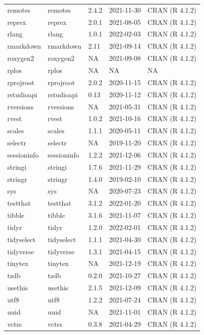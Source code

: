 \begin{tabular}{lllll}
remotes & remotes & 2.4.2 & 2021-11-30 & CRAN (R 4.1.2)\\
reprex & reprex & 2.0.1 & 2021-08-05 & CRAN (R 4.1.2)\\
rlang & rlang & 1.0.1 & 2022-02-03 & CRAN (R 4.1.2)\\
\addlinespace
rmarkdown & rmarkdown & 2.11 & 2021-09-14 & CRAN (R 4.1.2)\\
roxygen2 & roxygen2 & NA & 2021-09-08 & CRAN (R 4.1.2)\\
rplos & rplos & NA & NA & NA\\
rprojroot & rprojroot & 2.0.2 & 2020-11-15 & CRAN (R 4.1.2)\\
rstudioapi & rstudioapi & 0.13 & 2020-11-12 & CRAN (R 4.1.2)\\
\addlinespace
rversions & rversions & NA & 2021-05-31 & CRAN (R 4.1.2)\\
rvest & rvest & 1.0.2 & 2021-10-16 & CRAN (R 4.1.2)\\
scales & scales & 1.1.1 & 2020-05-11 & CRAN (R 4.1.2)\\
selectr & selectr & NA & 2019-11-20 & CRAN (R 4.1.2)\\
sessioninfo & sessioninfo & 1.2.2 & 2021-12-06 & CRAN (R 4.1.2)\\
\addlinespace
stringi & stringi & 1.7.6 & 2021-11-29 & CRAN (R 4.1.2)\\
stringr & stringr & 1.4.0 & 2019-02-10 & CRAN (R 4.1.2)\\
sys & sys & NA & 2020-07-23 & CRAN (R 4.1.2)\\
testthat & testthat & 3.1.2 & 2022-01-20 & CRAN (R 4.1.2)\\
tibble & tibble & 3.1.6 & 2021-11-07 & CRAN (R 4.1.2)\\
\addlinespace
tidyr & tidyr & 1.2.0 & 2022-02-01 & CRAN (R 4.1.2)\\
tidyselect & tidyselect & 1.1.1 & 2021-04-30 & CRAN (R 4.1.2)\\
tidyverse & tidyverse & 1.3.1 & 2021-04-15 & CRAN (R 4.1.2)\\
tinytex & tinytex & NA & 2021-12-19 & CRAN (R 4.1.2)\\
tzdb & tzdb & 0.2.0 & 2021-10-27 & CRAN (R 4.1.2)\\
\addlinespace
usethis & usethis & 2.1.5 & 2021-12-09 & CRAN (R 4.1.2)\\
utf8 & utf8 & 1.2.2 & 2021-07-24 & CRAN (R 4.1.2)\\
uuid & uuid & NA & 2021-11-01 & CRAN (R 4.1.2)\\
vctrs & vctrs & 0.3.8 & 2021-04-29 & CRAN (R 4.1.2)\\

\end{tabular}
